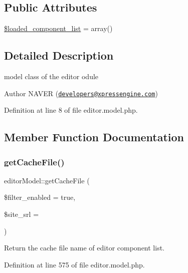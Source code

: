 \subsection*{Public Attributes}
\begin{DoxyCompactItemize}
\item 
\hyperlink{classeditorModel_ad909303f399467f4bd587e8369eb40a1}{\$loaded\+\_\+component\+\_\+list} = array()
\end{DoxyCompactItemize}


\subsection{Detailed Description}
model class of the editor odule 

\begin{DoxyAuthor}{Author}
N\+A\+V\+ER (\href{mailto:developers@xpressengine.com}{\tt developers@xpressengine.\+com}) 
\end{DoxyAuthor}


Definition at line 8 of file editor.\+model.\+php.



\subsection{Member Function Documentation}
\hypertarget{classeditorModel_ab125348dd5be10fdafe6e38922254d5e}{}\label{classeditorModel_ab125348dd5be10fdafe6e38922254d5e} 
\subsubsection{\texorpdfstring{get\+Cache\+File()}{getCacheFile()}}
{\footnotesize\ttfamily editor\+Model\+::get\+Cache\+File (\begin{DoxyParamCaption}\item[{}]{\$filter\+\_\+enabled = {\ttfamily true},  }\item[{}]{\$site\+\_\+srl = {} }\end{DoxyParamCaption})}



Return the cache file name of editor component list. 



Definition at line 575 of file editor.\+model.\+php.

\hypertarget{classeditorModel_a6330fcddc7363899989bfe4128010236}{}\label{classeditorModel_a6330fcddc7363899989bfe4128010236} 
